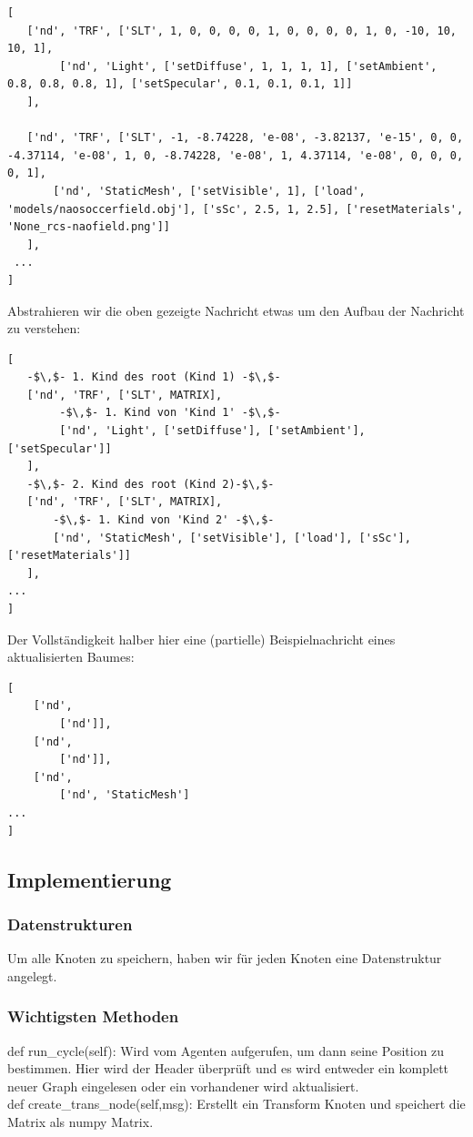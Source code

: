 \begin{verbatim}[
   ['nd', 'TRF', ['SLT', 1, 0, 0, 0, 0, 1, 0, 0, 0, 0, 1, 0, -10, 10, 10, 1], 
        ['nd', 'Light', ['setDiffuse', 1, 1, 1, 1], ['setAmbient', 0.8, 0.8, 0.8, 1], ['setSpecular', 0.1, 0.1, 0.1, 1]]
   ],
   
   ['nd', 'TRF', ['SLT', -1, -8.74228, 'e-08', -3.82137, 'e-15', 0, 0, -4.37114, 'e-08', 1, 0, -8.74228, 'e-08', 1, 4.37114, 'e-08', 0, 0, 0, 0, 1], 
       ['nd', 'StaticMesh', ['setVisible', 1], ['load', 'models/naosoccerfield.obj'], ['sSc', 2.5, 1, 2.5], ['resetMaterials', 'None_rcs-naofield.png']]
   ],
 ...
]
\end{verbatim}
Abstrahieren wir die oben gezeigte Nachricht etwas um den Aufbau der Nachricht zu verstehen:

\begin{verbatim}[
   -$\,$- 1. Kind des root (Kind 1) -$\,$-
   ['nd', 'TRF', ['SLT', MATRIX], 
        -$\,$- 1. Kind von 'Kind 1' -$\,$-
        ['nd', 'Light', ['setDiffuse'], ['setAmbient'], ['setSpecular']]
   ],
   -$\,$- 2. Kind des root (Kind 2)-$\,$-
   ['nd', 'TRF', ['SLT', MATRIX], 
       -$\,$- 1. Kind von 'Kind 2' -$\,$-
       ['nd', 'StaticMesh', ['setVisible'], ['load'], ['sSc'], ['resetMaterials']]
   ],
...
]
\end{verbatim}
Der Vollständigkeit halber hier eine (partielle) Beispielnachricht eines aktualisierten Baumes:

\begin{verbatim}[
    ['nd', 
        ['nd']], 
    ['nd', 
        ['nd']], 
    ['nd', 
        ['nd', 'StaticMesh']
...
]
\end{verbatim}
\subsection*{Implementierung}
\subsubsection*{Datenstrukturen}
Um alle Knoten zu speichern, haben wir für jeden Knoten eine Datenstruktur angelegt.

\subsubsection*{Wichtigsten Methoden}
def run\_cycle(self): Wird vom Agenten aufgerufen, um dann seine 
Position zu bestimmen. Hier wird der Header überprüft und es wird 
entweder ein komplett neuer Graph eingelesen oder ein vorhandener wird 
aktualisiert.\\
def create\_trans\_node(self,msg): Erstellt ein Transform Knoten und speichert die Matrix als numpy Matrix.

